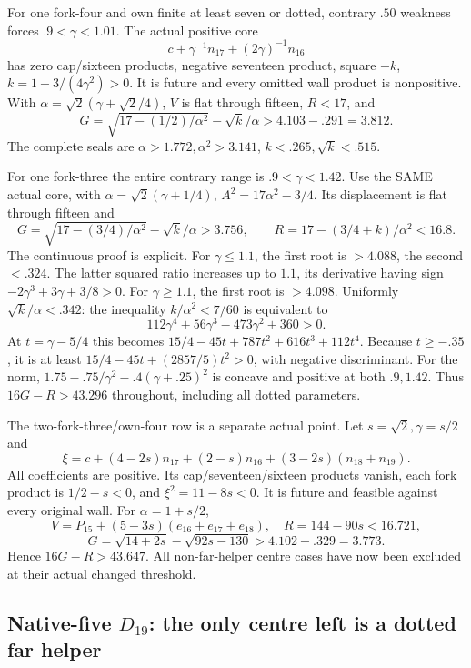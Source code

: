 \documentclass[11pt]{article}
\theoremstyle{definition}
\theoremstyle{remark}
\begin{document}
For one fork-four and own
finite at least seven or dotted,
contrary \(.50\) weakness forces
\(.9<\gamma<1.01\).
The actual positive core
\[
                         c+\gamma^{-1}n_{17}+(2\gamma)^{-1}n_{16}
\]
has zero cap/sixteen products,
negative seventeen product,
square \(-k\),
\(k=1-3/(4\gamma^2)>0\).
It is future and every omitted
wall product is nonpositive.
With
\(\alpha=\sqrt2(\gamma+\sqrt2/4)\),
\(V\) is flat through fifteen,
\(R<17\), and
\[
              G=\sqrt{17-(1/2)/\alpha^2}-\sqrt k/\alpha
                                      >4.103-.291=3.812 .
\]
The complete seals are
\(\alpha>1.772,\alpha^2>3.141\),
\(k<.265,\sqrt k<.515\).

For one fork-three the entire
contrary range is
\(.9<\gamma<1.42\).
Use the SAME actual core, with
\(\alpha=\sqrt2(\gamma+1/4)\),
\(A^2=17\alpha^2-3/4\).
Its displacement is flat through
fifteen and
\[
 G=\sqrt{17-(3/4)/\alpha^2}-\sqrt k/\alpha>3.756,\qquad
                    R=17-(3/4+k)/\alpha^2<16.8 .
\]
The continuous proof is explicit.
For \(\gamma\le1.1\), the first
root is \(>4.088\), the second
\(<.324\).
The latter squared ratio increases
up to \(1.1\), its derivative
having sign
\(-2\gamma^3+3\gamma+3/8>0\).
For \(\gamma\ge1.1\), the first
root is \(>4.098\).
Uniformly \(\sqrt k/\alpha<.342\):
the inequality \(k/\alpha^2<7/60\)
is equivalent to
\[
                    112\gamma^4+56\gamma^3-473\gamma^2+360>0 .
\]
At \(t=\gamma-5/4\) this becomes
\(15/4-45t+787t^2+616t^3+112t^4\).
Because \(t\ge-.35\), it is at
least
\(15/4-45t+(2857/5)t^2>0\),
with negative discriminant.
For the norm,
\(1.75-.75/\gamma^2-.4(\gamma+.25)^2\)
is concave and positive at
both \(.9,1.42\).
Thus \(16G-R>43.296\) throughout,
including all dotted parameters.

The two-fork-three/own-four row
is a separate actual point.
Let \(s=\sqrt2,\gamma=s/2\) and
\[
 \xi=c+(4-2s)n_{17}+(2-s)n_{16}
                                 +(3-2s)(n_{18}+n_{19}).
\]
All coefficients are positive.
Its cap/seventeen/sixteen products
vanish, each fork product is
\(1/2-s<0\), and
\(\xi^2=11-8s<0\).
It is future and feasible
against every original wall.
For \(\alpha=1+s/2\),
\[
 V=P_{15}+(5-3s)(e_{16}+e_{17}+e_{18}),\quad
 R=144-90s<16.721,
\]
\[
 G=\sqrt{14+2s}-\sqrt{92s-130}
                                      >4.102-.329=3.773 .
\]
Hence \(16G-R>43.647\).
All non-far-helper centre cases
have now been excluded at their
actual changed threshold.

\subsection[Native-five D19: the only centre left is a dotted far helper]{Native-five \(D_{19}\): the only centre left is a dotted far helper}
\label{app:exact19:Dfivefarcentre}
\end{document}
